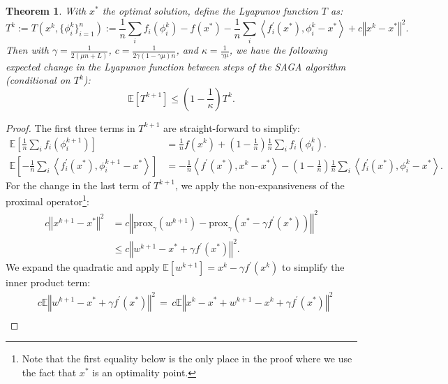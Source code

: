 \documentclass{article}
\newtheorem{thm}{Theorem}
\newcommand{\stepsize}{\gamma} %
\begin{document}
\begin{thm}
\label{thm:strong-convex-thm} With $x^*$ the optimal solution, define the Lyapunov function $T$ as: 
\[
T^k := T(x^k, \{\phi_i^k\}_{i=1}^n) :=\frac{1}{n}\sum_{i}f_{i}(\phi^k_{i})-f(x^{*})-\frac{1}{n}\sum_{i}\left\langle f_{i}^{\prime}(x^{*}),\phi^k_{i}-x^{*}\right\rangle +c\left\Vert x^k-x^{*}\right\Vert ^{2}.
\]
 Then with $\stepsize=\frac{1}{2(\mu n+L)}$, $c=\frac{1}{2\stepsize(1-\stepsize\mu)n}$, and $\kappa=\frac{1}{\stepsize\mu}$, we have the following expected change in the Lyapunov function between steps of the SAGA algorithm (conditional on $T^k$):
\[
\mathbb{E}[T^{k+1}]\leq(1-\frac{1}{\kappa})T^{k}.
\]
\end{thm}
\begin{proof}
\vspace{-2mm}
The first three terms in $T^{k+1}$ are straight-forward to simplify:
\begin{align*}
\mathbb{E}\left[\frac{1}{n}\sum_{i}f_{i}(\phi_{i}^{k+1})\right] & = \frac{1}{n}f(x^k)+\left(1-\frac{1}{n}\right)\frac{1}{n}\sum_{i}f_{i}(\phi_{i}^{k}). \\
\mathbb{E}\left[-\frac{1}{n}\sum_{i}\left\langle f_{i}^{\prime}(x^{*}),\phi_{i}^{k+1}-x^{*}\right\rangle \right] & = 
 -\frac{1}{n}\left\langle f^{\prime}(x^{*}),x^k-x^{*}\right\rangle \!- \! \left(1 \! - \! \frac{1}{n}\right)\frac{1}{n}\sum_{i}\left\langle f_{i}^{\prime}(x^{*}),\phi_{i}^{k}-x^{*}\right\rangle .
\end{align*}
For the change in the last term of $T^{k+1}$, we apply the non-expansiveness of the proximal operator\footnote{Note that the first equality below is the only place in the proof where we use the fact that $x^*$ is an optimality point.}:
\begin{align*}
c\left\Vert x^{k+1}-x^{*}\right\Vert ^{2} & = c\left\Vert \text{prox}_{\stepsize}(w^{k+1})-\text{prox}_{\stepsize}(x^{*}-\stepsize f^{\prime}(x^{*}))\right\Vert ^{2}\\
 & \leq c\left\Vert w^{k+1}-x^{*}+\stepsize f^{\prime}(x^{*})\right\Vert ^{2}.
\end{align*}
We expand the quadratic and apply $\mathbb{E}[w^{k+1}]=x^{k}-\stepsize f^{\prime}(x^{k})$
to simplify the inner product term:
\begin{align*}
  & \!\!\!\!\! c\mathbb{E}\left\Vert w^{k+1}-x^{*}+\stepsize f^{\prime}(x^{*})\right\Vert ^{2} \, = \,  c\mathbb{E}\left\Vert x^k-x^{*}+w^{k+1}-x^k+\stepsize f^{\prime}(x^{*})\right\Vert ^{2}\\

\end{align*}
\end{proof}
\end{document}
